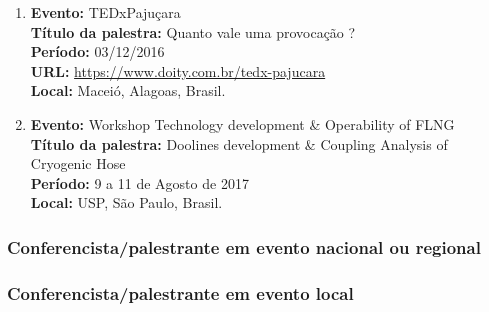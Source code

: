 \documentclass[a4paper,oneside,10pt]{article}
\begin{document}
\begin{enumerate}
\renewcommand{\labelenumi}{{\large\bfseries\arabic{enumi}.}}

\item   \textbf{Evento:} TEDxPajuçara \mbox{} \\
        \textbf{Título da palestra:} Quanto vale uma provocação ?\\
        \textbf{Período:} 03/12/2016\\
        \textbf{URL:} \url{https://www.doity.com.br/tedx-pajucara}\\
        \textbf{Local:} Maceió, Alagoas, Brasil.
        
\item   \textbf{Evento:} Workshop Technology development \& Operability of FLNG \mbox{} \\
        \textbf{Título da palestra:} Doolines development \& Coupling Analysis of Cryogenic Hose\\
        \textbf{Período:} 9 a 11 de Agosto de 2017\\
        \textbf{Local:} USP, São Paulo, Brasil.
           
 \end{enumerate}
  
\newpage      

\subsubsection{Conferencista/palestrante em evento nacional ou regional}
\vspace{0.3cm}

\subsubsection{Conferencista/palestrante em evento local}
\vspace{0.3cm}
\end{document}
